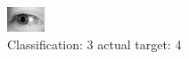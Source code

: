 \begin{figure}[h!]
\begin{center}
\includegraphics[width=0.60\columnwidth]{figures/ID3268_class_3_target_4.png}
\end{center}
\caption{ Classification: 3 actual target: 4}
\label{fig:ID3268_class_3_target_4}
\end{figure}
